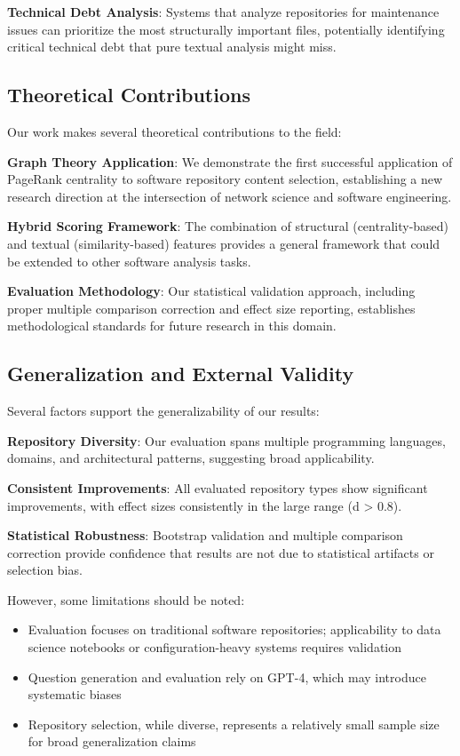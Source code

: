 \documentclass[conference]{IEEEtran}
\begin{document}
\textbf{Technical Debt Analysis}: Systems that analyze repositories for maintenance issues can prioritize the most structurally important files, potentially identifying critical technical debt that pure textual analysis might miss.

\subsection{Theoretical Contributions}

Our work makes several theoretical contributions to the field:

\textbf{Graph Theory Application}: We demonstrate the first successful application of PageRank centrality to software repository content selection, establishing a new research direction at the intersection of network science and software engineering.

\textbf{Hybrid Scoring Framework}: The combination of structural (centrality-based) and textual (similarity-based) features provides a general framework that could be extended to other software analysis tasks.

\textbf{Evaluation Methodology}: Our statistical validation approach, including proper multiple comparison correction and effect size reporting, establishes methodological standards for future research in this domain.

\subsection{Generalization and External Validity}

Several factors support the generalizability of our results:

\textbf{Repository Diversity}: Our evaluation spans multiple programming languages, domains, and architectural patterns, suggesting broad applicability.

\textbf{Consistent Improvements}: All evaluated repository types show significant improvements, with effect sizes consistently in the large range (d > 0.8).

\textbf{Statistical Robustness}: Bootstrap validation and multiple comparison correction provide confidence that results are not due to statistical artifacts or selection bias.

However, some limitations should be noted:
\begin{itemize}
\item Evaluation focuses on traditional software repositories; applicability to data science notebooks or configuration-heavy systems requires validation
\item Question generation and evaluation rely on GPT-4, which may introduce systematic biases
\item Repository selection, while diverse, represents a relatively small sample size for broad generalization claims
\end{itemize}
\end{document}
